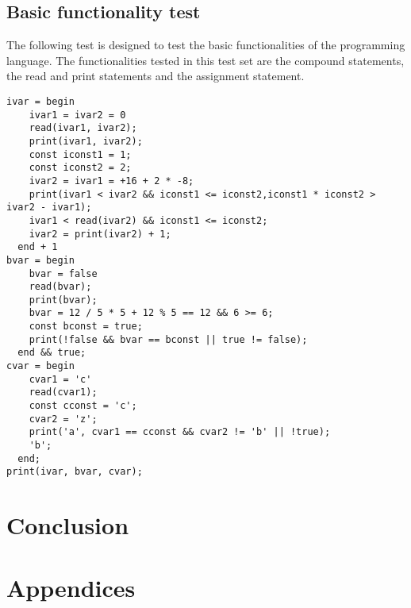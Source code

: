 \documentclass[paper=a4, fontsize=11pt]{article}
\numberwithin{equation}{section}		%
\numberwithin{figure}{section}			%
\numberwithin{table}{section}				%
\begin{document}
\subsection{Basic functionality test}
The following test is designed to test the basic functionalities of the programming language. The functionalities tested in this test set are the compound statements, the read and print statements and the assignment statement.

\begin{lstlisting}
ivar = begin
    ivar1 = ivar2 = 0
    read(ivar1, ivar2);
    print(ivar1, ivar2);
    const iconst1 = 1;
    const iconst2 = 2;
    ivar2 = ivar1 = +16 + 2 * -8;
    print(ivar1 < ivar2 && iconst1 <= iconst2,iconst1 * iconst2 > ivar2 - ivar1);
    ivar1 < read(ivar2) && iconst1 <= iconst2;
    ivar2 = print(ivar2) + 1;
  end + 1
bvar = begin
    bvar = false
    read(bvar);
    print(bvar);
    bvar = 12 / 5 * 5 + 12 % 5 == 12 && 6 >= 6;
    const bconst = true;
    print(!false && bvar == bconst || true != false);
  end && true;
cvar = begin
    cvar1 = 'c'
    read(cvar1);
    const cconst = 'c';
    cvar2 = 'z';
    print('a', cvar1 == cconst && cvar2 != 'b' || !true);
    'b';
  end;
print(ivar, bvar, cvar);
\end{lstlisting}

\section{Conclusion}
\section{Appendices}
% 
\end{document}
